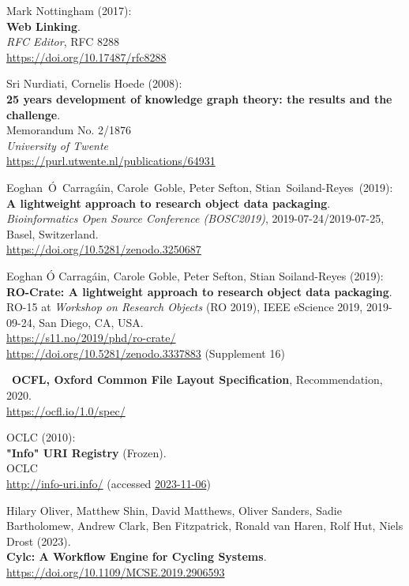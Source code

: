 \begin{thebibliography}{9}
Mark Nottingham (2017): \\
\textbf{Web {Linking}}.\\
\emph{RFC Editor}, RFC 8288\\
\url{https://doi.org/10.17487/rfc8288}

Sri Nurdiati, Cornelis Hoede (2008):\\
\textbf{25 years development of knowledge graph theory: the results and the challenge}.\\
Memorandum No. 2/1876\\
\emph{University of Twente}\\
\url{https://purl.utwente.nl/publications/64931}

Eoghan~Ó~Carragáin, Carole~Goble, Peter Sefton,
Stian~Soiland-Reyes~(2019):\\
\textbf{A lightweight approach to research object data packaging}.\\
\emph{Bioinformatics Open Source Conference (BOSC2019)},
2019-07-24/2019-07-25, Basel, Switzerland.\\
\url{https://doi.org/10.5281/zenodo.3250687}

Eoghan Ó Carragáin, Carole Goble, Peter Sefton, Stian Soiland-Reyes (2019):\\
\textbf{RO-Crate: A lightweight approach to research object data packaging}.\\
RO-15 at \emph{Workshop on Research Objects} (RO 2019), IEEE eScience 2019, 2019-09-24, San Diego, CA, USA.\\
\url{https://s11.no/2019/phd/ro-crate/}\\
\url{https://doi.org/10.5281/zenodo.3337883}
(Supplement 16)

~\textbf{OCFL, Oxford Common File Layout Specification},
Recommendation, 2020.\\
\url{https://ocfl.io/1.0/spec/}

OCLC (2010): \\
\textbf{"Info" {URI Registry}} ({Frozen}). \\
OCLC\\
\url{http://info-uri.info/} 
(accessed \href{https://web.archive.org/web/20231106015204/https://oclc-research.github.io/infoURI-Frozen/}{2023-11-06})

Hilary Oliver, Matthew Shin, David Matthews, Oliver Sanders, Sadie Bartholomew, Andrew Clark, Ben Fitzpatrick, Ronald van Haren, Rolf Hut, Niels Drost
(2023).\\
\textbf{Cylc: A Workflow Engine for Cycling Systems}.\\
\url{https://doi.org/10.1109/MCSE.2019.2906593}


\end{thebibliography}
